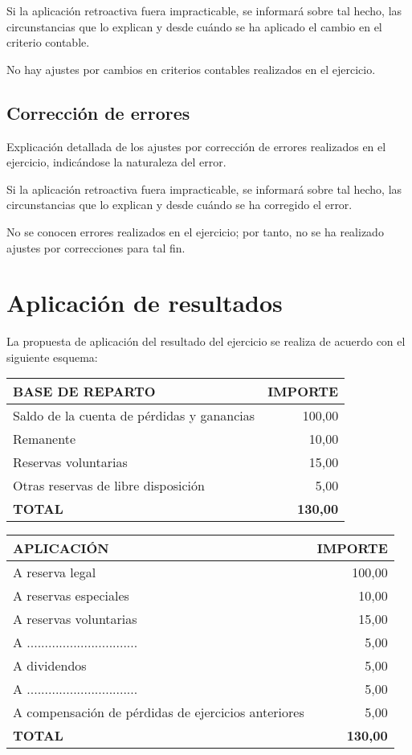 \documentclass[11pt,a4paper]{article}
\begin{document}
Si la aplicación retroactiva fuera impracticable, se informará sobre tal hecho, las circunstancias que lo explican y desde cuándo se ha aplicado el cambio en el criterio contable.

No hay ajustes por cambios en criterios contables realizados en el ejercicio.

\subsection{Corrección de errores}
Explicación detallada de los ajustes por corrección de errores realizados en el ejercicio, indicándose la naturaleza del error.

Si la aplicación retroactiva fuera impracticable, se informará sobre tal hecho, las circunstancias que lo explican y desde cuándo se ha corregido el error.

No se conocen errores realizados en el ejercicio; por tanto, no se ha realizado ajustes por correcciones para tal fin.

\section{Aplicación de resultados}
La propuesta de aplicación del resultado del ejercicio se realiza de acuerdo con el siguiente esquema:
\begin{center}
\begin{tabular}{|l|r|}
\hline
\textbf {BASE DE REPARTO} & \textbf {IMPORTE} \\ 
\hline
Saldo de la cuenta de pérdidas y ganancias & 100,00 \\ 
\hline
Remanente & 10,00 \\ 
\hline
Reservas voluntarias & 15,00 \\ 
\hline
Otras reservas de libre disposición & 5,00 \\ 
\hline
\textbf {TOTAL} & \textbf {130,00} \\
\hline
\end{tabular}
\end{center}


\begin{center}
\begin{tabular}{|l|r|}
\hline
\textbf {APLICACIÓN} & \textbf {IMPORTE} \\ 
\hline
A reserva legal & 100,00 \\ 
\hline
A reservas especiales & 10,00 \\ 
\hline
A reservas voluntarias & 15,00 \\ 
\hline
A ............................... & 5,00 \\ 
\hline
A dividendos & 5,00 \\ 
\hline
A ............................... & 5,00 \\ 
\hline
A compensación de pérdidas de ejercicios anteriores & 5,00 \\ 
\hline
\textbf {TOTAL} & \textbf {130,00} \\
\hline
\end{tabular}
\end{center}
\end{document}
